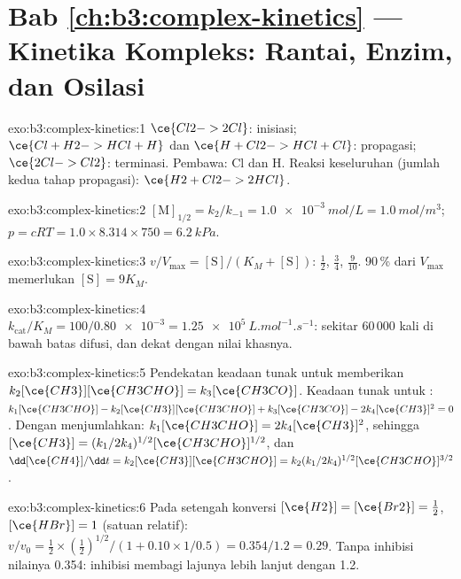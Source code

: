 \section*{Bab \ref{ch:b3:complex-kinetics} --- Kinetika Kompleks: Rantai, Enzim, dan Osilasi}

\begin{solution}{exo:b3:complex-kinetics:1}
$\ce{Cl2 -> 2 Cl}$: inisiasi; $\ce{Cl + H2 -> HCl + H}$ dan $\ce{H + Cl2 -> HCl + Cl}$:
propagasi; $\ce{2 Cl -> Cl2}$: terminasi. Pembawa: Cl dan H. Reaksi keseluruhan
(jumlah kedua tahap propagasi): $\ce{H2 + Cl2 -> 2 HCl}$.
\end{solution}

\begin{solution}{exo:b3:complex-kinetics:2}
$[\mathrm M]_{1/2} = k_2/k_{-1} = \qty{1.0e-3}{mol/L} = \qty{1.0}{mol/m^3}$; $p = cRT = 1.0 \times 8.314 \times 750 =
\qty{6.2}{kPa}$.
\end{solution}

\begin{solution}{exo:b3:complex-kinetics:3}
$v/V_{\max} = [\mathrm S]/(K_M + [\mathrm S])$: $\frac12$, $\frac34$, $\frac{9}{10}$. 90\,\% dari $V_{\max}$ memerlukan $[\mathrm S] = 9K_M$.
\end{solution}

\begin{solution}{exo:b3:complex-kinetics:4}
$k_{\mathrm{cat}}/K_M = 100/\num{0.80e-3} = \qty{1.25e5}{L.mol^{-1}.s^{-1}}$: sekitar 60\,000 kali
di bawah batas difusi, dan dekat dengan nilai khasnya.
\end{solution}

\begin{solution}{exo:b3:complex-kinetics:5}
Pendekatan keadaan tunak untuk  memberikan $k_2[\ce{CH3}][\ce{CH3CHO}] = k_3[\ce{CH3CO}]$. Keadaan
tunak untuk :
$k_1[\ce{CH3CHO}] - k_2[\ce{CH3}][\ce{CH3CHO}] + k_3[\ce{CH3CO}] - 2k_4[\ce{CH3}]^2 = 0$.
Dengan menjumlahkan: $k_1[\ce{CH3CHO}] =
2k_4[\ce{CH3}]^2$, sehingga $[\ce{CH3}] = (k_1/2k_4)^{1/2}[\ce{CH3CHO}]^{1/2}$, dan $\dd[\ce{CH4}]/\dd t = k_2[\ce{CH3}][\ce{CH3CHO}] =
k_2(k_1/2k_4)^{1/2}[\ce{CH3CHO}]^{3/2}$.
\end{solution}

\begin{solution}{exo:b3:complex-kinetics:6}
Pada setengah konversi $[\ce{H2}] = [\ce{Br2}] = \frac12$, $[\ce{HBr}] = 1$ (satuan
relatif): $v/v_0 = \frac12 \times (\frac12)^{1/2}/(1 + 0.10 \times 1/0.5) = 0.354/1.2 = 0.29$.
Tanpa inhibisi nilainya 0.354: inhibisi membagi lajunya lebih lanjut dengan 1.2.
\end{solution}

